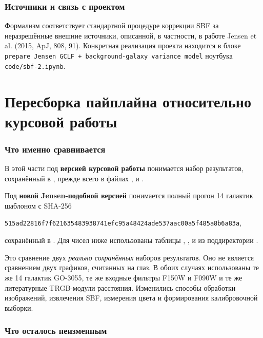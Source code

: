 \documentclass[12pt,a4paper]{article}
\begin{document}
\section{Источники и связь с проектом}

Формализм соответствует стандартной процедуре коррекции SBF
за неразрешённые внешние источники, описанной, в частности,
в работе Jensen et al. (2015, ApJ, 808, 91). Конкретная
реализация проекта находится в блоке
\texttt{prepare Jensen GCLF + background-galaxy variance model}
ноутбука \texttt{code/sbf-2.ipynb}.

\clearpage
\part{Пересборка пайплайна относительно курсовой работы}

\section{Что именно сравнивается}

В этой части под \textbf{версией курсовой работы} понимается
набор результатов, сохранённый в
, прежде всего в файлах
,
 и
.

Под \textbf{новой Jensen-подобной версией} понимается полный
прогон 14 галактик шаблоном  с
SHA-256
\begin{center}
\texttt{515ad22816f7f621635483938741efc95a48424ade537aac00a5f485a8b6a83a},
\end{center}
сохранённый в
. Для чисел ниже использованы таблицы
,
,
 и
 из поддиректории
.

Это сравнение двух \emph{реально сохранённых} наборов
результатов. Оно не является сравнением двух графиков,
считанных на глаз. В обоих случаях использованы те же 14
галактик GO-3055, те же входные фильтры F150W и F090W и те
же литературные TRGB-модули расстояния. Изменились способы
обработки изображений, извлечения SBF, измерения цвета и
формирования калибровочной выборки.

\section{Что осталось неизменным}
\end{document}
